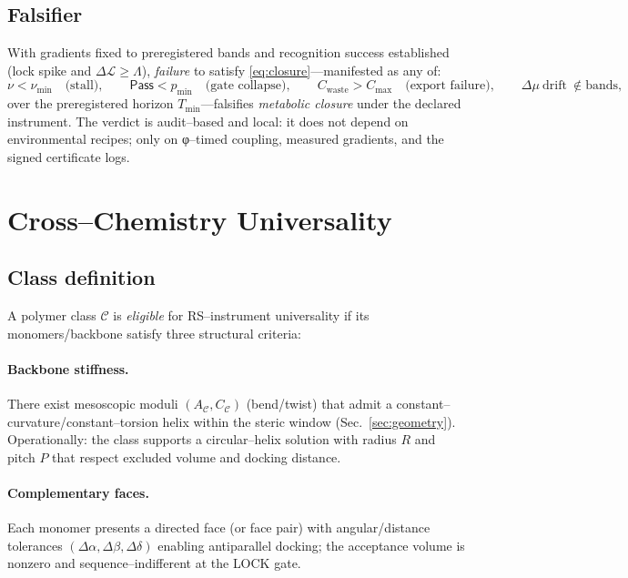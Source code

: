 \documentclass[11pt]{article}
\begin{document}
\subsection{Falsifier}\label{sec:closure-falsifier}
With gradients fixed to preregistered bands and recognition success established (lock spike and $\Delta\mathcal{L}\ge\Lambda$), \emph{failure} to satisfy \eqref{eq:closure}—manifested as any of:
\[
\nu<\nu_{\min}\quad\text{(stall)},\qquad
\textsf{Pass}<p_{\min}\quad\text{(gate collapse)},\qquad
C_{\mathrm{waste}}>C_{\max}\quad\text{(export failure)},\qquad
\Delta\mu\ \text{drift}\ \notin\text{bands},
\]
over the preregistered horizon $T_{\min}$—falsifies \emph{metabolic closure} under the declared instrument. The verdict is audit–based and local: it does not depend on environmental recipes; only on φ–timed coupling, measured gradients, and the signed certificate logs.

\section{Cross–Chemistry Universality}\label{sec:universality}

\subsection{Class definition}\label{sec:class-def}
A polymer class $\mathcal{C}$ is \emph{eligible} for RS–instrument universality if its monomers/backbone satisfy three structural criteria:

\paragraph{Backbone stiffness.}
There exist mesoscopic moduli $(A_{\mathcal{C}},C_{\mathcal{C}})$ (bend/twist) that admit a constant–curvature/constant–torsion helix within the steric window (Sec.~\ref{sec:geometry}). Operationally: the class supports a circular–helix solution with radius $R$ and pitch $P$ that respect excluded volume and docking distance.

\paragraph{Complementary faces.}
Each monomer presents a directed face (or face pair) with angular/distance tolerances $(\Delta\alpha,\Delta\beta,\Delta\delta)$ enabling antiparallel docking; the acceptance volume is nonzero and sequence–indifferent at the \textsf{LOCK} gate.
\end{document}
